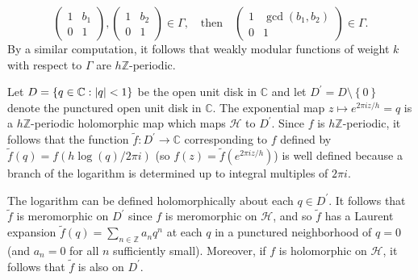 \documentclass[10pt,leqno,twoside]{article}
\theoremstyle{plain}
\theoremstyle{definition}
\numberwithin{equation}{section}
\numberwithin{lem}{section}
\newcommand{\cbr}[1]{\left\{#1\right\}}
\begin{document}
\[\begin{pmatrix}
    1 & b_1 \\ 0 & 1
\end{pmatrix},\begin{pmatrix}
    1 & b_2 \\ 0 & 1
\end{pmatrix}\in\varGamma, \quad \text{then}\quad \begin{pmatrix}
    1 & \gcd(b_1,b_2) \\ 0 & 1
\end{pmatrix}\in \varGamma.\]
By a similar computation, it follows that weakly modular functions of weight $k$ with respect to $\varGamma$ are $h\mathbb Z$-periodic.

Let $D = \cbr{q\in\mathbb C : \abs{q} <1}$ be the open unit disk in $\mathbb C$ and let $D^\prime = D\!\setminus \!\cbr{0}$ denote the punctured open unit disk in $\mathbb C$. The exponential map $z\mapsto e^{2\pi i z/h} = q$ is a $h\mathbb{Z}$-periodic holomorphic map which maps $\mathcal H$ to $D^\prime$. Since $f$ is $h\mathbb{Z}$-periodic, it follows that the function $\tilde f\colon D^\prime\to\mathbb C$ corresponding to $f$ defined by $\tilde f(q) = f(h\log (q)/2\pi i)$ (so $f(z) = \tilde f(e^{2\pi i z/h})$) is well defined because a branch of the logarithm is determined up to integral multiples of $2\pi i$.

The logarithm can be defined holomorphically about each $q\in D^\prime$. It follows that $\tilde f$ is meromorphic on $D^\prime$ since $f$ is meromorphic on $\mathcal H$, and so $\tilde f$ has a Laurent expansion $\tilde f(q) = \sum_{n\in\mathbb Z}a_nq^n$ at each $q$ in a punctured neighborhood of $q=0$ (and $a_n = 0$ for all $n$ sufficiently small). Moreover, if $f$ is holomorphic on $\mathcal H$, it follows that $\tilde f$ is also on $D^\prime$.
\end{document}
